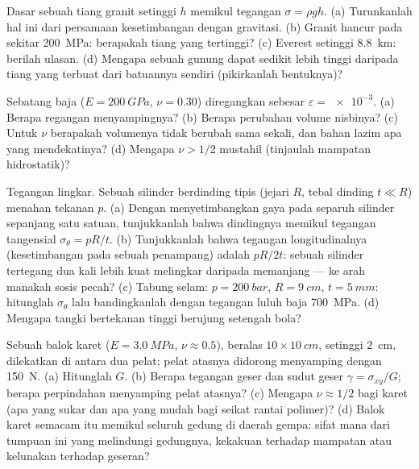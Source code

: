 \begin{exercise}[$\star$]\label{exo:b3:continuum-elasticity:3}
Dasar sebuah tiang granit setinggi $h$ memikul tegangan $\sigma
= \rho gh$. (a) Turunkanlah hal ini dari persamaan kesetimbangan dengan
gravitasi. (b) Granit hancur pada sekitar \qty{200}{MPa}: berapakah
tiang yang tertinggi? (c) Everest setinggi \qty{8.8}{km}: berilah
ulasan. (d) Mengapa sebuah gunung dapat sedikit lebih tinggi daripada
tiang yang terbuat dari batuannya sendiri (pikirkanlah bentuknya)?
\end{exercise}

\begin{exercise}[$\star$]\label{exo:b3:continuum-elasticity:4}
Sebatang baja ($E = \qty{200}{GPa}$, $\nu = 0.30$) diregangkan sebesar
$\varepsilon = \num{e-3}$. (a) Berapa regangan menyampingnya? (b) Berapa
perubahan volume nisbinya? (c) Untuk $\nu$ berapakah volumenya tidak
berubah sama sekali, dan bahan lazim apa yang mendekatinya? (d) Mengapa
$\nu > 1/2$ mustahil (tinjaulah mampatan hidrostatik)?
\end{exercise}

\begin{exercise}[$\star\star$]\label{exo:b3:continuum-elasticity:5}
Tegangan lingkar. Sebuah silinder berdinding tipis (jejari $R$, tebal
dinding $t \ll
R$) menahan tekanan $p$. (a) Dengan menyetimbangkan gaya pada separuh
silinder sepanjang satu satuan, tunjukkanlah bahwa dindingnya memikul
tegangan tangensial $\sigma_\theta = pR/t$. (b) Tunjukkanlah bahwa
tegangan longitudinalnya (kesetimbangan pada sebuah penampang) adalah
$pR/2t$: sebuah silinder tertegang dua kali lebih kuat melingkar
daripada memanjang --- ke arah manakah sosis pecah? (c) Tabung selam: $p =
\qty{200}{bar}$, $R = \qty{9}{cm}$, $t = \qty{5}{mm}$: hitunglah
$\sigma_\theta$ lalu bandingkanlah dengan tegangan luluh baja
\qty{700}{MPa}. (d) Mengapa tangki bertekanan tinggi berujung setengah
bola?
\end{exercise}

\begin{exercise}[$\star\star$]\label{exo:b3:continuum-elasticity:6}
Sebuah balok karet ($E = \qty{3.0}{MPa}$, $\nu \approx 0.5$), beralas $10
\times \qty{10}{cm}$, setinggi \qty{2}{cm}, dilekatkan di antara dua
pelat; pelat atasnya didorong menyamping dengan \qty{150}{N}. (a)
Hitunglah $G$. (b) Berapa tegangan geser dan sudut geser
$\gamma = \sigma_{xy}/G$; berapa perpindahan menyamping pelat atasnya?
(c) Mengapa $\nu \approx 1/2$ bagi karet (apa yang sukar dan apa yang
mudah bagi seikat rantai polimer)? (d) Balok karet semacam itu memikul
seluruh gedung di daerah gempa: sifat mana dari tumpuan ini yang
melindungi gedungnya, kekakuan terhadap mampatan atau kelunakan terhadap
geseran?
\end{exercise}

